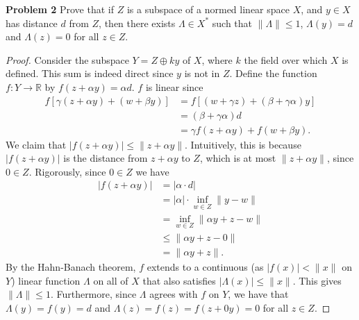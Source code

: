 \documentclass[11pt,letterpaper]{report}
\newcommand{\reals}{\mathbb{R}}
\begin{document}
\noindent\textbf{Problem 2}
Prove that if $Z$ is a subspace of a normed linear space $X$, and $y\in X$ has distance $d$ from $Z$, then there exists $\Lambda\in X^*$ such that $\|\Lambda\|\leq 1$, $\Lambda(y) = d$ and $\Lambda(z) =0$ for all $z\in Z$.
\begin{proof}
	Consider the subspace $Y = Z\oplus ky$ of $X$, where $k$ the field over which $X$ is defined. This sum is indeed direct since $y$ is not in $Z$. Define the function $f: Y\to \reals$ by $f(z + \alpha y) = \alpha d$. $f$ is linear since
	\begin{align*}
		f[\gamma(z+\alpha y) + (w + \beta y)] &= f[(w+\gamma z) + (\beta+\gamma\alpha)y]\\
		&= (\beta+\gamma\alpha)d\\
		&= \gamma f(z+\alpha y) + f(w+\beta y).
	\end{align*}
	We claim that $|f(z+\alpha y)|\leq \|z+\alpha y\|$. Intuitively, this is because $|f(z+\alpha y)|$ is the distance from $z+\alpha y$ to $Z$, which is at most $\|z+\alpha y\|$, since $0\in Z$. Rigorously, since $0\in Z$ we have
	\begin{align*}
		|f(z+\alpha y)| &= |\alpha\cdot d|\\
		&= |\alpha|\cdot \inf_{w\in Z}\|y - w\|\\
		&= \inf_{w\in Z}\|\alpha y + z - w\|\\
		&\leq \|\alpha y+z - 0\|\\
		&= \|\alpha y + z\|.
	\end{align*}
	By the Hahn-Banach theorem, $f$ extends to a continuous (as $|f(x)|<\|x\|$ on $Y$) linear function $\Lambda$ on all of $X$ that also satisfies $|\Lambda(x)|\leq \|x\|$. This gives $\|\Lambda\|\leq 1$. Furthermore, since $\Lambda$ agrees with $f$ on $Y$, we have that $\Lambda(y) = f(y) = d$ and $\Lambda(z) = f(z) = f(z+0y) = 0$ for all $z\in Z$.
\end{proof}
\end{document}
